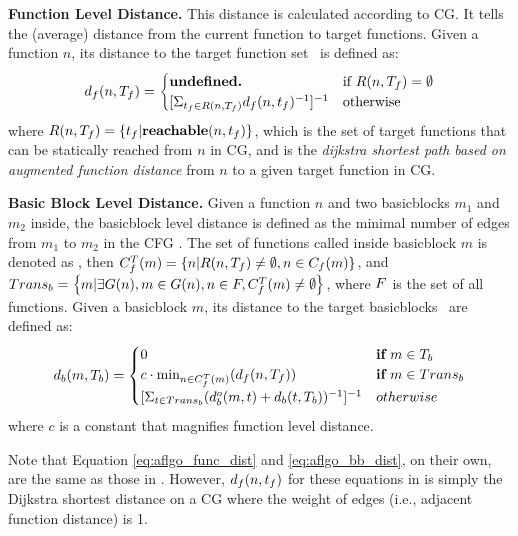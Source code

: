 \textbf{Function Level Distance.} This distance is calculated according to CG. It tells the (average) distance from the current function to target functions. Given a function $n$, its distance to the target function set \tgtfnset~is defined as:
{\myeqsize\begin{equation}
d_f(n, \tgtfnset) =
\begin{cases}
\textbf{undefined.} & \text{if}~R(n, \tgtfnset)=\emptyset \\
[\Sigma_{\tgtfn\in R(n, \tgtfnset)} \traceFnDist{n}{\tgtfn}^{-1}]^{-1} & \textmd{otherwise} \\
\end{cases}
\label{eq:aflgo_func_dist}
\end{equation}}
where $R(n, T_f) = \left\{t_f | \textbf{reachable}(n, t_f)\right\}$,
which is the set of target functions that can be statically reached from $n$ in CG, and  is the \emph{dijkstra shortest path based on augmented function distance} from $n$ to a given target function {\tgtfn} in CG.

\textbf{Basic Block Level Distance.} Given a function $n$ and two basicblocks $m_1$ and $m_2$ inside, the basicblock level distance  is defined as the minimal number of edges from $m_1$ to $m_2$ in the CFG .
The set of functions called inside basicblock $m$ is denoted as ,
then $C_f^T(m)=\left\{n | R(n, T_f)\neq\emptyset, n\in C_f(m) \right\}$, 
and $Trans_b=\left\{m| \exists G(n), m\in G(n), n\in F, C_f^T(m)\neq\emptyset \right\}$, where $F$ is the set of all functions.
Given a basicblock $m$, its distance to the target basicblocks \tgtbbset~are defined as:
{\myeqsize\begin{equation}
d_b(m, T_b) = 
\begin{cases}
0 & \textbf{if}~m\in T_b \\
c\cdot \text{min}_{n\in C_f^T(m)}(d_f(n,T_f))& \textbf{if}~m\in Trans_b\\
\Large[\Sigma_{t\in Trans_b}\large(d_b^o(m,t) + d_b(t, T_b)\large)^{-1}\Large]^{-1} & otherwise
\end{cases}
\label{eq:aflgo_bb_dist}
\end{equation}}
where $c$ is a constant that magnifies function level distance.

Note that Equation \ref{eq:aflgo_func_dist} and \ref{eq:aflgo_bb_dist}, on their own, are the same as those in \aflgo \cite{Bohme:2017:DGF}. However, $d_f(n,t_f)$ for these equations in \aflgo is simply the Dijkstra shortest distance on a CG where the weight of edges (i.e., adjacent function distance) is 1.

